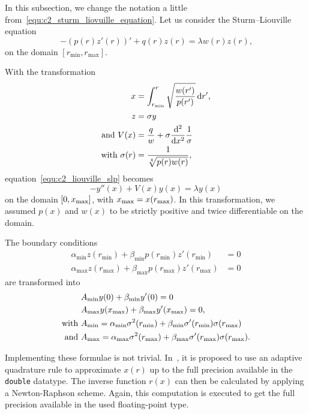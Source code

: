 In this subsection, we change the notation a little from~\eqref{equ:c2_sturm_liovuille_equation}. Let us consider the Sturm--Liouville equation
\begin{equation}\label{equ:c2_liouville_slp}
    -(p(r) z'(r))' + q(r) z(r) = \lambda w(r) z(r)\text{,}
\end{equation}
on the domain $[r_\text{min}, r_\text{max}]$.

With the transformation
\begin{align*}
    x                      & = \int_{r_\text{min}}^{r} \sqrt{\frac{w(r')}{p(r')}}\,\dd r'\text{,} \\
    z                      & = \sigma y                                                           \\
    \text{and } V(x)       & = \frac{q}{w} + \sigma {\dv[2]{}{x}} \frac{1}{\sigma}                \\
    \text{with } \sigma(r) & = \frac{1}{\sqrt[4]{p(r)w(r)}},
\end{align*}
equation~\eqref{equ:c2_liouville_slp} becomes
$$
    -y''(x) + V(x) y(x) = \lambda y(x)
$$
on the domain $[0, {x_{\text{max}}}]$, with ${x_{\text{max}}} = x(r_\text{max})$. In this transformation, we assumed $p(x)$ and $w(x)$ to be strictly positive and twice differentiable on the domain.

The boundary conditions
\begin{align*}
    \alpha_\text{min} z(r_\text{min}) + \beta_\text{min} p(r_\text{min}) z'(r_\text{min}) & = 0 \\
    \alpha_\text{max} z(r_\text{max}) + \beta_\text{max} p(r_\text{max}) z'(r_\text{max}) & = 0
\end{align*}
are transformed into
\begin{align*}
                 & A_\text{min} y(0) + \beta_\text{min} y'(0) = 0                                                                             \\
                 & A_\text{max} y({x_{\text{max}}}) + \beta_\text{max} y'({x_{\text{max}}}) = 0 \text{,}                                                            \\
    \text{with } & A_\text{min} = \alpha_\text{min}\sigma^2(r_\text{min}) + \beta_\text{min}\sigma'(r_\text{min})\sigma(r_\text{max})         \\
    \text{and }  & A_\text{max} = \alpha_\text{max}\sigma^2(r_\text{max}) + \beta_\text{max}\sigma'(r_\text{max})\sigma(r_\text{max})\text{.}
\end{align*}

Implementing these formulae is not trivial. In~\cite{ledoux_study_2007}, it is proposed to use an adaptive quadrature rule to approximate $x(r)$ up to the full precision available in the \texttt{double} datatype. The inverse function $r(x)$ can then be calculated by applying a Newton-Raphson scheme. Again, this computation is executed to get the full precision available in the used floating-point type.

